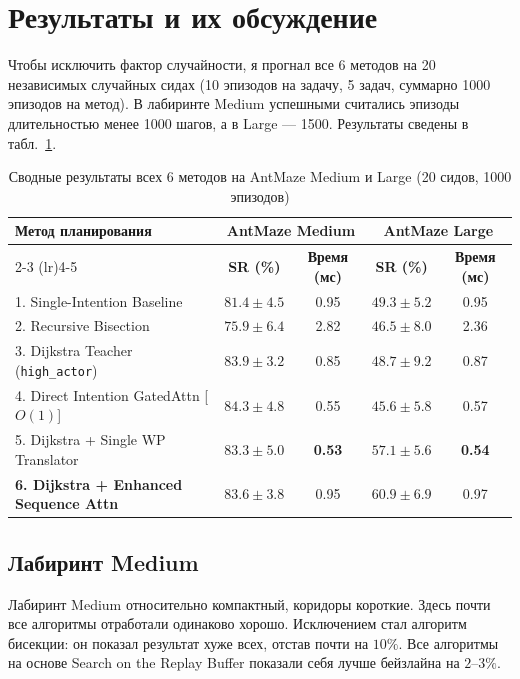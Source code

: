 \section{Результаты и их обсуждение}

Чтобы исключить фактор случайности, я прогнал все 6 методов на 20 независимых случайных сидах (10 эпизодов на задачу, 5 задач, суммарно 1000 эпизодов на метод). В лабиринте Medium успешными считались эпизоды длительностью менее 1000 шагов, а в Large --- 1500. Результаты сведены в табл.~\ref{tab:main_benchmark}.


\begin{table}[t]
    \centering
    \small
    \setlength{\tabcolsep}{8pt}
    \caption{Сводные результаты всех 6 методов на AntMaze Medium и Large (20 сидов, 1000 эпизодов)}
    \label{tab:main_benchmark}
    \begin{tabular}{lcccc}
        \toprule
        \multirow{2}{*}{\textbf{Метод планирования}} & \multicolumn{2}{c}{\textbf{AntMaze Medium}} & \multicolumn{2}{c}{\textbf{AntMaze Large}} \\
        \cmidrule(lr){2-3} \cmidrule(lr){4-5}
        & \textbf{SR (\%)} & \textbf{Время (мс)} & \textbf{SR (\%)} & \textbf{Время (мс)} \\
        \midrule
        1. Single-Intention Baseline & $81.4 \pm 4.5$ & 0.95 & $49.3 \pm 5.2$ & 0.95 \\
        2. Recursive Bisection & $75.9 \pm 6.4$ & 2.82 & $46.5 \pm 8.0$ & 2.36 \\
        3. Dijkstra Teacher (\texttt{high\_actor}) & $83.9 \pm 3.2$ & 0.85 & $48.7 \pm 9.2$ & 0.87 \\
        4. Direct Intention GatedAttn [$O(1)$] & $\mathbf{84.3 \pm 4.8}$ & 0.55 & $45.6 \pm 5.8$ & 0.57 \\
        5. Dijkstra + Single WP Translator & $83.3 \pm 5.0$ & \textbf{0.53} & $57.1 \pm 5.6$ & \textbf{0.54} \\
        \textbf{6. Dijkstra + Enhanced Sequence Attn} & $83.6 \pm 3.8$ & 0.95 & $\mathbf{60.9 \pm 6.9}$ & 0.97 \\
        \bottomrule
    \end{tabular}
\end{table}

\subsection{Лабиринт Medium}
Лабиринт Medium относительно компактный, коридоры короткие. Здесь почти все алгоритмы отработали одинаково хорошо. Исключением стал алгоритм бисекции: он показал результат хуже всех, отстав почти на $10\%$. Все алгоритмы на основе Search on the Replay Buffer показали себя лучше бейзлайна на $2\text{--}3\%$.

